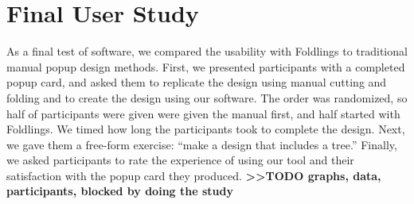\section{Final User Study}\label{final-user-study}

As a final test of software, we compared the usability with Foldlings to
traditional manual popup design methods. First, we presented
participants with a completed popup card, and asked them to replicate
the design using manual cutting and folding and to create the design
using our software. The order was randomized, so half of participants
were given were given the manual first, and half started with Foldlings.
We timed how long the participants took to complete the design. Next, we
gave them a free-form exercise: ``make a design that includes a tree.''
Finally, we asked participants to rate the experience of using our tool
and their satisfaction with the popup card they produced.
\textbf{\textgreater{}\textgreater{}TODO graphs, data, participants,
blocked by doing the study}
